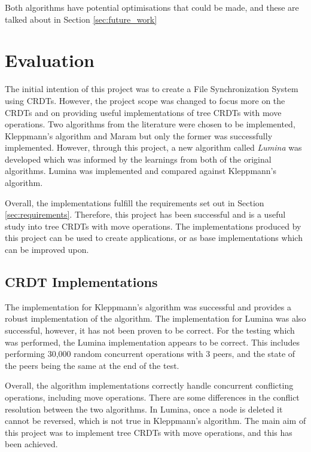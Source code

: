 \documentclass[12pt]{report}
\begin{document}
Both algorithms have potential optimisations that could be made, and these are talked about in Section \ref{sec:future_work}

\chapter{Evaluation}
The initial intention of this project was to create a File Synchronization System using CRDTs. However, the project scope was changed to focus more on the CRDTs and on providing useful implementations of tree CRDTs with move operations. Two algorithms from the literature were chosen to be implemented, Kleppmann's algorithm\cite{9563274} and Maram\cite{https://doi.org/10.48550/arxiv.2103.04828} but only the former was successfully implemented. However, through this project, a new algorithm called \textit{Lumina} was developed which was informed by the learnings from both of the original algorithms. Lumina was implemented and compared against Kleppmann's algorithm. \par 

Overall, the implementations fulfill the requirements set out in Section \ref{sec:requirements}. Therefore, this project has been successful and is a useful study into tree CRDTs with move operations. The implementations produced by this project can be used to create applications, or as base implementations which can be improved upon. \par

\section{CRDT Implementations}
The implementation for Kleppmann's algorithm was successful and provides a robust implementation of the algorithm. The implementation for Lumina was also successful, however, it has not been proven to be correct. For the testing which was performed, the Lumina implementation appears to be correct. This includes performing 30,000 random concurrent operations with 3 peers, and the state of the peers being the same at the end of the test. 

Overall, the algorithm implementations correctly handle concurrent conflicting operations, including move operations. There are some differences in the conflict resolution between the two algorithms. In Lumina, once a node is deleted it cannot be reversed, which is not true in Kleppmann's algorithm. The main aim of this project was to implement tree CRDTs with move operations, and this has been achieved. \par
\end{document}
